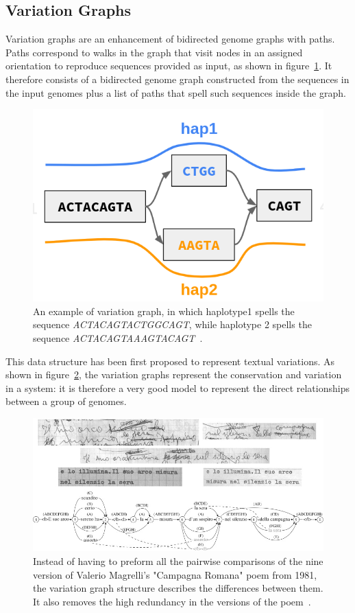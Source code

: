 \subsection{Variation Graphs}
Variation graphs are an enhancement of bidirected genome graphs with paths. Paths correspond to walks in the graph that visit nodes in an assigned orientation to reproduce sequences provided as input, as shown in figure~\ref{fig:vg_example}. It therefore consists of a bidirected genome graph constructed from the sequences in the input genomes plus a list of paths that spell such sequences inside the graph.
\begin{figure}[h!]
	\centering
	\includegraphics[width=.65\linewidth]{figures/background/vg.png}
	\caption[The Variation Graph model.]{An example of variation graph, in which haplotype1 spells the sequence \emph{ACTACAGTACTGGCAGT}, while haplotype 2 spells the sequence \emph{ACTACAGTAAAGTACAGT}~\cite{garrison_pangenome}.}
	\label{fig:vg_example}
\end{figure}
This data structure has been first proposed to represent textual variations. As shown in figure~\ref{fig:campagna_romana}, the variation graphs represent the conservation and variation in a system: it is therefore a very good model to represent the direct relationships between a group of genomes.
\begin{figure}[h!]
	\centering
	\includegraphics[width=.95\linewidth]{figures/background/variant_graph.jpg}
	\caption[The Variation Graph origin.]{Instead of having to preform all the pairwise comparisons of the nine version of Valerio Magrelli's "Campagna Romana" poem from 1981, the variation graph structure describes the differences between them. It also removes the high redundancy in the versions of the poem~\cite{variant_graph,garrison_pangenome}.}
	\label{fig:campagna_romana}
\end{figure}
